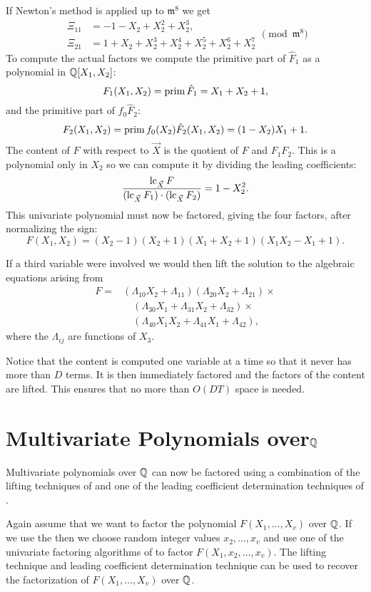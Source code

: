 If Newton's method is applied up to $\mathfrak{m}^8$ we get
\[
\begin{aligned}
\Xi_{11} &= -1 -X_2 + X_2^2 + X_2^3, \\
\Xi_{21} &= 1 + X_2 + X_2^3 + X_2^4 + X_2^5 + X_2^6 + X_2^7
\end{aligned}
\pmod{\mathfrak{m}^8}
\]
To compute the actual factors we compute the primitive
part of $\hat{F}_1$ as a
polynomial in $\mathbb{Q}[X_1, X_2]$:
\[
F_1(X_1, X_2) = \operatorname{prim} \hat{F}_1 = X_1 + X_2 + 1,
\]
and the primitive part of $f_0 \hat{F}_2$:
\[
F_2(X_1, X_2) = \operatorname{prim} f_0(X_2) \hat{F}_2(X_1, X_2) = (1 - X_2) X_1 +
1.
\]
The content of $F$ with respect to $\vec{X}$ is the quotient of $F$
and $F_1 F_2$.  This is a polynomial only in $X_2$ so we can compute
it by dividing the leading coefficients:
\[
\frac{\operatorname{lc}_{\vec{X}} F}{(\operatorname{lc}_{\vec{X}} F_1) \cdot (\operatorname{lc}_{\vec{X}} F_2)}
= 1 - X_2^2.
\]
This univariate polynomial must now be factored, giving the four
factors, after normalizing the sign:
\[
F(X_1, X_2) =
(X_2 -1) (X_2 + 1) (X_1 + X_2 + 1) (X_1 X_2 - X_1 + 1).
\]

If a third variable were involved we would then lift the solution to
the algebraic equations arising from
\[
\begin{aligned}
F = 
&(\Lambda_{10}X_2 + \Lambda_{11})
(\Lambda_{20}X_2 + \Lambda_{21}) \times \\
&\quad (\Lambda_{30} X_1 + \Lambda_{31}X_2 + \Lambda_{32}) \times \\
&\quad (\Lambda_{40}X_1 X_2 + \Lambda_{41} X_1 + \Lambda_{42}),
\end{aligned}
\]
where the $\Lambda_{ij}$ are functions of $X_3$.

Notice that the content is computed one variable at a time so that it
never has more than $D$ terms.  It is then immediately factored and
the factors of the content are lifted.  This ensures that no more
than $O(DT)$ space is needed.

\section{Multivariate Polynomials over\texorpdfstring{$\mathbb{Q}$}{Q}}
\label{GF:Integers:Sec}

Multivariate polynomials over $\mathbb{Q}$ can now be factored using a
combination of the lifting techniques of  and one
of the leading coefficient determination techniques of
.

Again assume that we want to factor the polynomial $F(X_1, \ldots, X_v)$
over $\mathbb{Q}$. If we use the  then we
choose random integer values $x_2, \ldots, x_v$ and use one of the
univariate factoring algorithms of  to factor
$F(X_1, x_2, \ldots, x_v)$.  The lifting technique and leading
coefficient determination technique can be used to recover the
factorization of $F(X_1, \ldots, X_v)$ over $\mathbb{Q}$.

